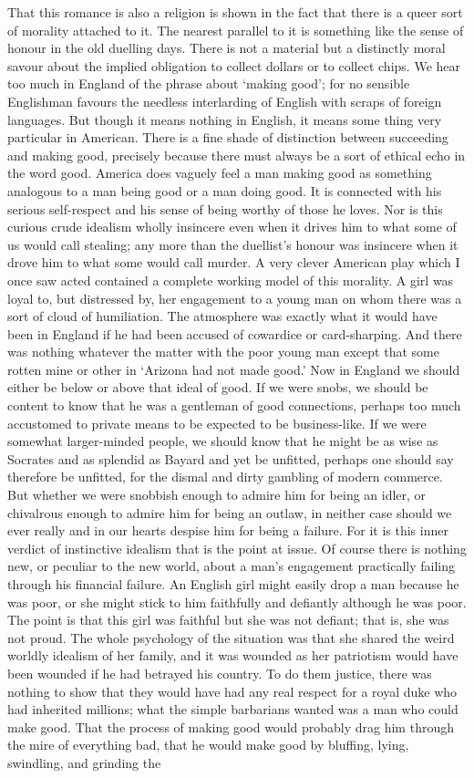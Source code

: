 \documentclass{book}
\begin{document}
That this romance is also a religion is shown in the fact that there is a queer sort of morality attached to it. The nearest parallel to it is something like the sense of honour in the old duelling days. There is not a material but a distinctly moral savour about the implied obligation to collect dollars or to collect chips. We hear too much in England of the phrase about ‘making good’; for no sensible Englishman favours the needless interlarding of English with scraps of foreign languages. But though it means nothing in English, it means some thing very particular in American. There is a fine shade of distinction between succeeding and making good, precisely because there must always be a sort of ethical echo in the word good. America does vaguely feel a man making good as something analogous to a man being good or a man doing good. It is connected with his serious self-respect and his sense of being worthy of those he loves. Nor is this curious crude idealism wholly insincere even when it drives him to what some of us would call stealing; any more than the duellist’s honour was insincere when it drove him to what some would call murder. A very clever American play which I once saw acted contained a complete working model of this morality. A girl was loyal to, but distressed by, her engagement to a young man on whom there was a sort of cloud of humiliation. The atmosphere was exactly what it would have been in England if he had been accused of cowardice or card-sharping. And there was nothing whatever the matter with the poor young man except that some rotten mine or other in ‘Arizona had not made good.’ Now in England we should either be below or above that ideal of good. If we were snobs, we should be content to know that he was a gentleman of good connections, perhaps too much accustomed to private means to be expected to be business-like. If we were somewhat larger-minded people, we should know that he might be as wise as Socrates and as splendid as Bayard and yet be unfitted, perhaps one should say therefore be unfitted, for the dismal and dirty gambling of modern commerce. But whether we were snobbish enough to admire him for being an idler, or chivalrous enough to admire him for being an outlaw, in neither case should we ever really and in our hearts despise him for being a failure. For it is this inner verdict of instinctive idealism that is the point at issue. Of course there is nothing new, or peculiar to the new world, about a man’s engagement practically failing through his financial failure. An English girl might easily drop a man because he was poor, or she might stick to him faithfully and defiantly although he was poor. The point is that this girl was faithful but she was not defiant; that is, she was not proud. The whole psychology of the situation was that she shared the weird worldly idealism of her family, and it was wounded as her patriotism would have been wounded if he had betrayed his country. To do them justice, there was nothing to show that they would have had any real respect for a royal duke who had inherited millions; what the simple barbarians wanted was a man who could make good. That the process of making good would probably drag him through the mire of everything bad, that he would make good by bluffing, lying, swindling, and grinding the 
\end{document}
